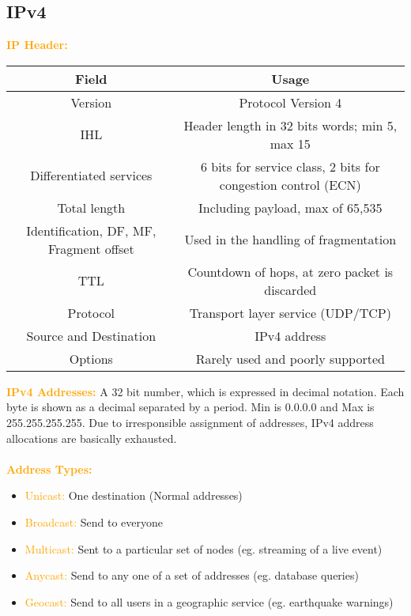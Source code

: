 \documentclass[a4paper,10pt]{article}
\begin{document}
\subsection{IPv4}
\textcolor{Orange}{\textbf{IP Header:}}
\begin{center}
	\begin{tabular}{|c|c|}
		\hline 
		\textbf{Field} & \textbf{Usage} \\
		\hline
		\hline 
		Version &Protocol Version 4 \\
		\hline 
		IHL &Header length in 32 bits words; min 5, max 15 \\
		\hline 
		Differentiated services &6 bits for service class, 2 bits for congestion control (ECN) \\
		\hline 
		Total length &Including payload, max of 65,535 \\
		\hline 
		Identification, DF, MF, Fragment offset &Used in the handling of fragmentation \\ 
		\hline 
		TTL &Countdown of hops, at zero packet is discarded \\ 
		\hline 
		Protocol &Transport layer service (UDP/TCP) \\
		\hline 
		Source and Destination &IPv4 address \\ 
		\hline 
		Options &Rarely used and poorly supported \\ 
		\hline 
	\end{tabular}
\end{center}
\textcolor{Orange}{\textbf{IPv4 Addresses:}} A 32 bit number, which is expressed in decimal notation. Each byte is shown as a decimal separated by a period. Min is 0.0.0.0 and Max is 255.255.255.255. Due to irresponsible assignment of addresses, IPv4 address allocations are basically exhausted.\\\\ 
\textcolor{Orange}{\textbf{Address Types:}}
\begin{itemize}
	\item \textcolor{Orange}{Unicast:} One destination (Normal addresses)
	\item \textcolor{Orange}{Broadcast:} Send to everyone 
	\item \textcolor{Orange}{Multicast:} Sent to a particular set of nodes (eg. streaming of a live event) 
	\item \textcolor{Orange}{Anycast:} Send to any one of a set of addresses (eg. database queries)
	\item \textcolor{Orange}{Geocast:} Send to all users in a geographic service (eg. earthquake warnings)
\end{itemize}
\end{document}
